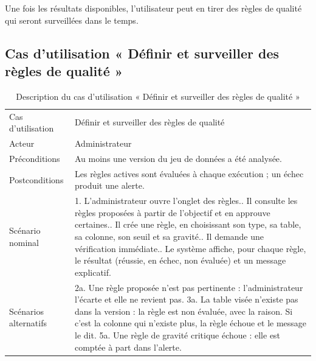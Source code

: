 Une fois les résultats disponibles, l'utilisateur peut en tirer des règles de qualité qui seront surveillées dans le temps.

\subsection{Cas d'utilisation « Définir et surveiller des règles de qualité »}


\begin{table}[H]
\centering
\small
\begin{tabular}{|L{3.4cm}|L{10.6cm}|}
\hline
{} &  \\ \hline
Cas d'utilisation & Définir et surveiller des règles de qualité \\ \hline
Acteur & Administrateur \\ \hline
Préconditions & Au moins une version du jeu de données a été analysée. \\ \hline
Postconditions & Les règles actives sont évaluées à chaque exécution ; un échec produit une alerte. \\ \hline
Scénario nominal &
1. L'administrateur ouvre l'onglet des règles.. Il consulte les règles proposées à partir de l'objectif et en approuve certaines.. Il crée une règle, en choisissant son type, sa table, sa colonne, son seuil et sa gravité.. Il demande une vérification immédiate.. Le système affiche, pour chaque règle, le résultat (réussie, en échec, non évaluée) et un message explicatif. \\ \hline
Scénarios alternatifs &
2a. Une règle proposée n'est pas pertinente : l'administrateur l'écarte et elle ne revient pas.\newline
3a. La table visée n'existe pas dans la version : la règle est non évaluée, avec la raison. Si c'est la colonne qui n'existe plus, la règle échoue et le message le dit.\newline
5a. Une règle de gravité critique échoue : elle est comptée à part dans l'alerte. \\ \hline
\end{tabular}
\caption{Description du cas d'utilisation « Définir et surveiller des règles de qualité »}
\label{tab:cu-regles}
\end{table}

